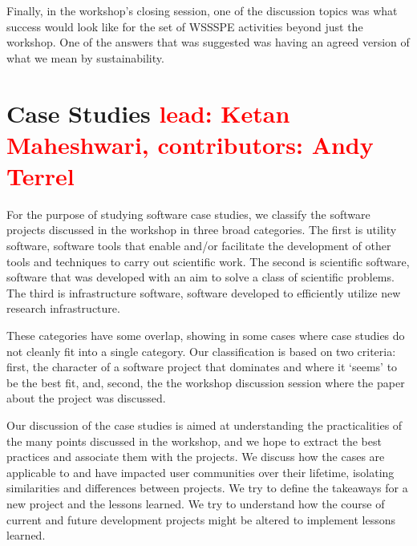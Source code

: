 \documentclass[11pt, oneside]{amsart}
\newcommand{\note}[1]{ {\textcolor{red}    { #1 }}}
\begin{document}
Finally, in the workshop's closing session, one of the discussion topics was
what success would look like for the set of WSSSPE activities beyond just the workshop.
One of the answers that was suggested was
having an agreed version of what we mean by sustainability.


\section{Case Studies \note{lead: Ketan Maheshwari, contributors: Andy Terrel}} \label{sec:use-cases}

For the purpose of studying software case studies, we classify the software
projects discussed in the workshop in three broad categories. The first is 
utility software, software tools that enable and/or facilitate the
development of other tools and techniques to carry out scientific work. The second is
scientific software, software that was developed with an aim to solve a
class of scientific problems. The third is infrastructure software, software
developed to efficiently utilize new research infrastructure.

These categories have some overlap, showing in some cases where
case studies do not cleanly fit into a single category.
Our classification is based on two criteria: first, the character
of a software project that dominates and where it `seems' to be the best fit, and, second,
the the workshop discussion session where the paper about
the project was discussed. 


Our discussion of the case studies is aimed at understanding the practicalities of
the many points discussed in the workshop, and we hope to extract the best
practices and associate them with the projects. We discuss how the cases are
applicable to and have impacted user communities over their lifetime, isolating
similarities and differences between projects. We try to define the takeaways for a new
project and the lessons learned. We try to understand how the course of current and
future development projects might be altered to implement lessons learned. 
\end{document}
